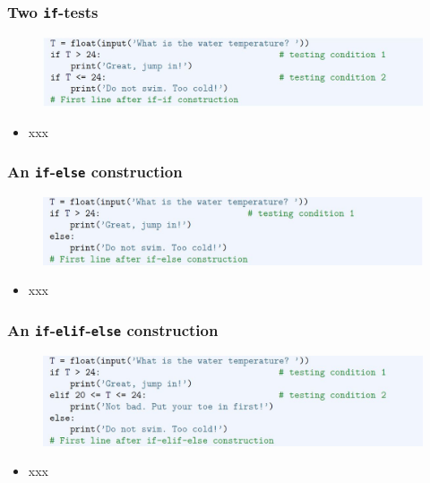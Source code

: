 \documentclass[english,14pt]{beamer}
\begin{document}
\begin{frame}[fragile]

\frametitle{Two \texttt{if}-tests}

\begin{figure}[ht]
	\centering
	\includegraphics[width=\textwidth]{figures/LLp68b}
\end{figure}

\begin{itemize}
	\item xxx
\end{itemize}

\end{frame}


\begin{frame}[fragile]

\frametitle{An \texttt{if}-\texttt{else} construction}

\begin{figure}[ht]
	\centering
	\includegraphics[width=\textwidth]{figures/LLp69a}
\end{figure}

\begin{itemize}
	\item xxx
\end{itemize}

\end{frame}


\begin{frame}[fragile]

\frametitle{An \texttt{if}-\texttt{elif}-\texttt{else} construction}

\begin{figure}[ht]
	\centering
	\includegraphics[width=\textwidth]{figures/LLp69b}
\end{figure}

\begin{itemize}
	\item xxx
\end{itemize}
\end{frame}
\end{document}
